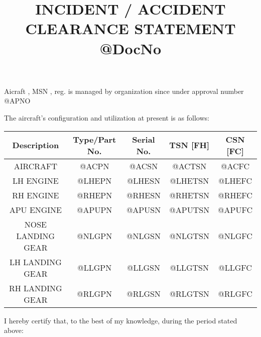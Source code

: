 \documentclass{article}
\title{INCIDENT / ACCIDENT CLEARANCE STATEMENT \\[1ex] @DocNo}
\date{}
\author{}
\begin{document}


\maketitle

\justifying
Aicraft \model, MSN \MSN, reg. \registration is managed by organization since \dateSinceMenaged under approval number @APNO
\par
The aircraft's configuration and utilization at present is as follows:
\vspace{20pt}

\begin{center}
    \begin{tabular}{|c|c|c|c|c|}
        \hline
         \textbf{Description} & \textbf{Type/Part No.} & \textbf{Serial No.} & \textbf{TSN [FH]} & \textbf{CSN [FC]}\\
         \hline
         AIRCRAFT & @ACPN & @ACSN & @ACTSN & @ACFC \\
         \hline
         LH ENGINE & @LHEPN & @LHESN & @LHETSN & @LHEFC \\
         \hline
         RH ENGINE & @RHEPN & @RHESN & @RHETSN & @RHEFC \\
         \hline
         APU ENGINE & @APUPN & @APUSN & @APUTSN & @APUFC \\
         \hline
         NOSE LANDING GEAR & @NLGPN & @NLGSN & @NLGTSN & @NLGFC \\
         \hline
         LH LANDING GEAR & @LLGPN & @LLGSN & @LLGTSN & @LLGFC \\
         \hline
         RH LANDING GEAR & @RLGPN & @RLGSN & @RLGTSN & @RLGFC \\
         \hline
    \end{tabular}
\end{center}

\vspace{20pt}

 I hereby certify that, to the best of my knowledge, during the period stated above:

 \vspace{10pt}
\end{document}
